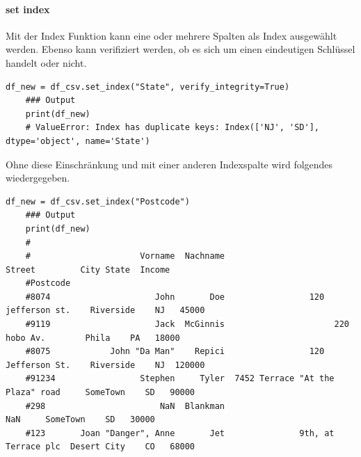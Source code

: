 \paragraph*{set index}
Mit der Index Funktion kann eine oder mehrere Spalten als Index ausgewählt werden. Ebenso kann verifiziert werden, ob es sich um einen eindeutigen Schlüssel handelt oder nicht.
\begin{lstlisting}[style=python]
	df_new = df_csv.set_index("State", verify_integrity=True)
	### Output
	print(df_new)
	# ValueError: Index has duplicate keys: Index(['NJ', 'SD'], dtype='object', name='State')
\end{lstlisting}
Ohne diese Einschränkung und mit einer anderen Indexspalte wird folgendes wiedergegeben.
\begin{lstlisting}[style=python]
	df_new = df_csv.set_index("Postcode")
	### Output
	print(df_new)
	#
	#                      Vorname  Nachname                            Street         City State  Income
	#Postcode
	#8074                     John       Doe                 120 jefferson st.    Riverside    NJ   45000
	#9119                     Jack  McGinnis                      220 hobo Av.        Phila    PA   18000
	#8075            John "Da Man"    Repici                 120 Jefferson St.    Riverside    NJ  120000
	#91234                 Stephen     Tyler  7452 Terrace "At the Plaza" road     SomeTown    SD   90000
	#298                       NaN  Blankman                               NaN     SomeTown    SD   30000
	#123       Joan "Danger", Anne       Jet               9th, at Terrace plc  Desert City    CO   68000
\end{lstlisting}
